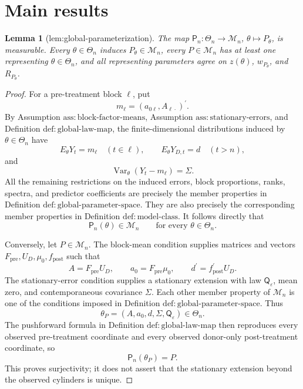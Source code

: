 \documentclass{article}
\newtheorem{lemma}{Lemma}
\begin{document}
\section{Main results}

\begin{lemma}[lem:global-parameterization]\label{lem:global-parameterization}
The map \(\mathsf P_n:\Theta_n\to\mathcal M_n\), \(\theta\mapsto P_\theta\), is measurable. Every \(\theta\in\Theta_n\) induces \(P_\theta\in\mathcal M_n\), every \(P\in\mathcal M_n\) has at least one representing \(\theta\in\Theta_n\), and all representing parameters agree on \(z(\theta)\), \(w_{P_\theta}\), and \(R_{P_\theta}\).
\end{lemma}
\begin{proof}
For a pre-treatment block \(\ell\), put
\[
m_\ell=(a_{0\ell},A_{\ell\cdot})^{\prime}.
\]
By Assumption \(\mathrm{ass:block\mbox{-}factor\mbox{-}means}\), Assumption \(\mathrm{ass:stationary\mbox{-}errors}\), and Definition \(\mathrm{def:global\mbox{-}law\mbox{-}map}\), the finite-dimensional distributions induced by \(\theta\in\Theta_n\) have
\[
E_\theta Y_t=m_\ell\quad(t\in\ell),\qquad
E_\theta Y_{D,t}=d\quad(t>n),
\]
and
\[
\operatorname{Var}_\theta(Y_t-m_\ell)=\Sigma.
\]
All the remaining restrictions on the induced errors, block proportions, ranks, spectra, and predictor coefficients are precisely the member properties in Definition \(\mathrm{def:global\mbox{-}parameter\mbox{-}space}\).  They are also precisely the corresponding member properties in Definition \(\mathrm{def:model\mbox{-}class}\).  It follows directly that
\[
\mathsf P_n(\theta)\in\mathcal M_n
\qquad\text{for every }\theta\in\Theta_n.
\]

Conversely, let \(P\in\mathcal M_n\).  The block-mean condition supplies matrices and vectors \(F_{\mathrm{pre}},U_D,\mu_0,f_{\mathrm{post}}\) such that
\[
A=F_{\mathrm{pre}}U_D,\qquad
a_0=F_{\mathrm{pre}}\mu_0,\qquad
d^{\prime}=f_{\mathrm{post}}^{\prime}U_D.
\]
The stationary-error condition supplies a stationary extension with law \(\mathsf Q_\varepsilon\), mean zero, and contemporaneous covariance \(\Sigma\).  Each other member property of \(\mathcal M_n\) is one of the conditions imposed in Definition \(\mathrm{def:global\mbox{-}parameter\mbox{-}space}\).  Thus
\[
\theta_P=(A,a_0,d,\Sigma,\mathsf Q_\varepsilon)\in\Theta_n.
\]
The pushforward formula in Definition \(\mathrm{def:global\mbox{-}law\mbox{-}map}\) then reproduces every observed pre-treatment coordinate and every observed donor-only post-treatment coordinate, so
\[
\mathsf P_n(\theta_P)=P.
\]
This proves surjectivity; it does not assert that the stationary extension beyond the observed cylinders is unique.


\end{proof}
\end{document}
